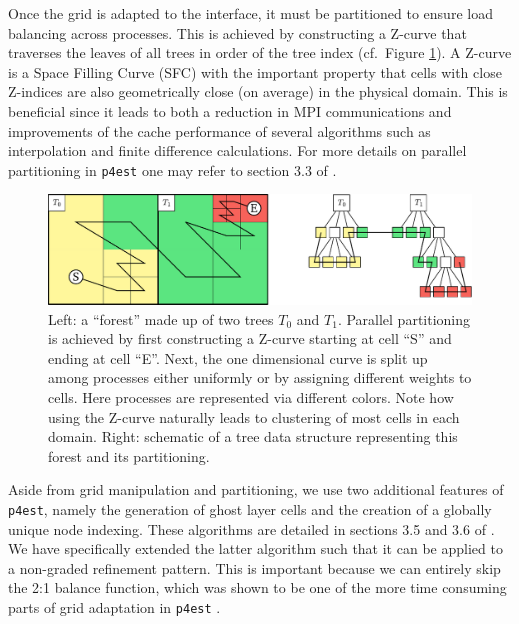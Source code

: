 Once the grid is adapted to the interface, it must be partitioned to ensure
load balancing across processes.
This is achieved by constructing a Z-curve that traverses the leaves of all
trees in order of the tree index (cf.\ Figure \ref{fig:p4est_zcurve}).
A Z-curve is a Space Filling Curve (SFC) with the important property that cells
with close Z-indices are also geometrically close (on average) in the physical
domain.
This is beneficial since it leads to both a reduction in MPI communications and
improvements of the cache performance of several algorithms such as
interpolation and finite difference calculations.
For more details on parallel partitioning in \texttt{p4est} one may refer to
section 3.3 of \cite{Burstedde;Wilcox;Ghattas:11:p4est:-Scalable-Algo}.
\begin{figure}[hbtp]
\begin{center}
\includegraphics[width = \columnwidth]{figures/p4est_zcurve.pdf}
\caption{Left: a ``forest'' made up of two trees $T_0$ and $T_1$. Parallel
partitioning is achieved by first constructing a Z-curve starting at cell ``S''
and ending at cell ``E''.  Next, the one dimensional curve is split up among
processes either uniformly or by assigning different weights to cells.  Here
processes are represented via different colors.  Note how using the Z-curve
naturally leads to clustering of most cells in each domain.  Right: schematic of
a tree data structure representing this forest and its partitioning.%
}
\label{fig:p4est_zcurve}
\end{center}
\end{figure}
Aside from grid manipulation and partitioning, we use two additional features
of \texttt{p4est}, namely the generation of ghost layer cells and the creation
of a globally unique node indexing.
These algorithms are detailed in sections 3.5 and 3.6 of
\cite{Burstedde;Wilcox;Ghattas:11:p4est:-Scalable-Algo}.
We have specifically extended the latter algorithm such that it can be applied
to a non-graded refinement pattern.
This is important because we can entirely skip the 2:1 balance function, which
was shown to be one of the more time consuming parts of grid adaptation
in \texttt{p4est}
\cite{Burstedde;Wilcox;Ghattas:11:p4est:-Scalable-Algo}.


